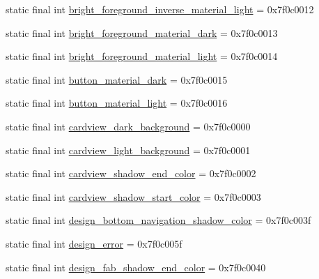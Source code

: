 \begin{CompactItemize}
\item 
static final int \hyperlink{classandroid_1_1support_1_1mediacompat_1_1_r_1_1color_2991989d48bc4678c77f95819a7c6d51}{bright\_\-foreground\_\-inverse\_\-material\_\-light} = 0x7f0c0012
\item 
static final int \hyperlink{classandroid_1_1support_1_1mediacompat_1_1_r_1_1color_5a5f638443982ee333f5c526009adc7c}{bright\_\-foreground\_\-material\_\-dark} = 0x7f0c0013
\item 
static final int \hyperlink{classandroid_1_1support_1_1mediacompat_1_1_r_1_1color_dcbef1a0762f1a0213ba507048b63d1f}{bright\_\-foreground\_\-material\_\-light} = 0x7f0c0014
\item 
static final int \hyperlink{classandroid_1_1support_1_1mediacompat_1_1_r_1_1color_3efef352558ffb7932c99dbd039ae2d6}{button\_\-material\_\-dark} = 0x7f0c0015
\item 
static final int \hyperlink{classandroid_1_1support_1_1mediacompat_1_1_r_1_1color_bf3452faef0d57622e43c18906104d70}{button\_\-material\_\-light} = 0x7f0c0016
\item 
static final int \hyperlink{classandroid_1_1support_1_1mediacompat_1_1_r_1_1color_d089fb99e5250eececfc71a51e427566}{cardview\_\-dark\_\-background} = 0x7f0c0000
\item 
static final int \hyperlink{classandroid_1_1support_1_1mediacompat_1_1_r_1_1color_fa54331f1167aaf909c29df0d93265ac}{cardview\_\-light\_\-background} = 0x7f0c0001
\item 
static final int \hyperlink{classandroid_1_1support_1_1mediacompat_1_1_r_1_1color_bedb5fe0fa77debf07324b233d5c0f00}{cardview\_\-shadow\_\-end\_\-color} = 0x7f0c0002
\item 
static final int \hyperlink{classandroid_1_1support_1_1mediacompat_1_1_r_1_1color_44ce6381d96ddf62dd03d6029d95007b}{cardview\_\-shadow\_\-start\_\-color} = 0x7f0c0003
\item 
static final int \hyperlink{classandroid_1_1support_1_1mediacompat_1_1_r_1_1color_e19524c0d3593039d4e3485fa42e6c9d}{design\_\-bottom\_\-navigation\_\-shadow\_\-color} = 0x7f0c003f
\item 
static final int \hyperlink{classandroid_1_1support_1_1mediacompat_1_1_r_1_1color_c0d193b7017c110f66e9dd45368b485d}{design\_\-error} = 0x7f0c005f
\item 
static final int \hyperlink{classandroid_1_1support_1_1mediacompat_1_1_r_1_1color_f6b72b2d05cc93fc585c83afa7a0afcb}{design\_\-fab\_\-shadow\_\-end\_\-color} = 0x7f0c0040
\item 

\end{CompactItemize}
